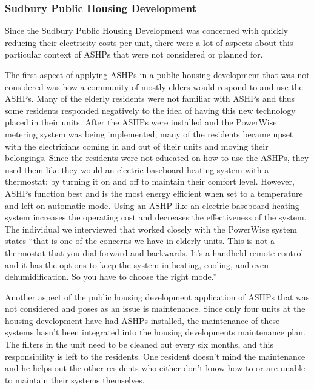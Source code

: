 \subsubsection{Sudbury Public Housing Development}
\par Since the Sudbury Public Housing Development was concerned with quickly reducing their electricity costs per unit, there were a lot of aspects about this particular context of ASHPs that were not considered or planned for.
\par The first aspect of applying ASHPs in a public housing development that was not considered was how a community of mostly elders would respond to and use the ASHPs. Many of the elderly residents were not familiar with ASHPs and thus some residents responded negatively to the idea of having this new technology placed in their units. After the ASHPs were installed and the PowerWise metering system was being implemented, many of the residents became upset with the electricians coming in and out of their units and moving their belongings. Since the residents were not educated on how to use the ASHPs, they used them like they would an electric baseboard heating system with a thermostat: by turning it on and off to maintain their comfort level. However, ASHPs function best and is the most energy efficient when set to a temperature and left on automatic mode. Using an ASHP like an electric baseboard heating system increases the operating cost and decreases the effectiveness of the system. The individual we interviewed that worked closely with the PowerWise system states “that is one of the concerns we have in elderly units. This is not a thermostat that you dial forward and backwards. It’s a handheld remote control and it has the options to keep the system in heating, cooling, and even dehumidification. So you have to choose the right mode.”
\par Another aspect of the public housing development application of ASHPs that was not considered and poses as an issue is maintenance. Since only four units at the housing development have had ASHPs installed, the maintenance of these systems hasn’t been integrated into the housing developments maintenance plan. The filters in the unit need to be cleaned out every six months, and this responsibility is left to the residents. One resident doesn’t mind the maintenance and he helps out the other residents who either don’t know how to or are unable to maintain their systems themselves.

